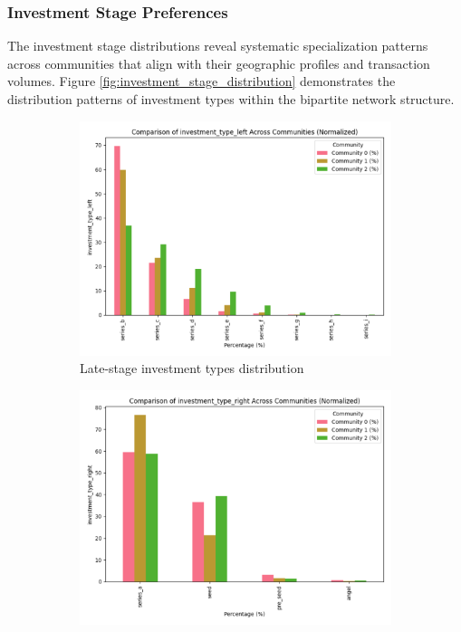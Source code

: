 
\subsubsection{Investment Stage Preferences}

The investment stage distributions reveal systematic specialization patterns across communities that align with their geographic profiles and transaction volumes. Figure \ref{fig:investment_stage_distribution} demonstrates the distribution patterns of investment types within the bipartite network structure.

\begin{figure}[htbp]
\centering
\begin{subfigure}[t]{0.48\textwidth}
    \centering
    \includegraphics[width=\textwidth]{./assets/late-investment-types-distribution.png}
    \caption{Late-stage investment types distribution}
    \label{fig:late_stage_types}
\end{subfigure}
\hfill
\begin{subfigure}[t]{0.48\textwidth}
    \centering
    \includegraphics[width=\textwidth]{./assets/early-investment-types-distribution.png}

\end{subfigure}
\end{figure}

